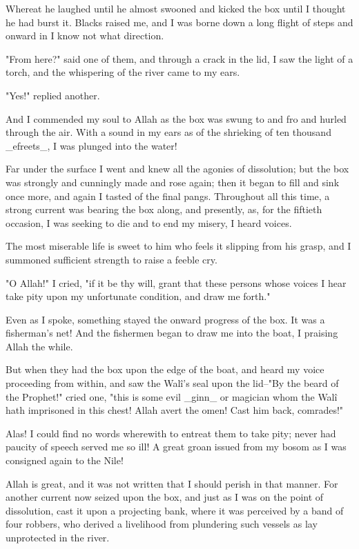 Whereat he laughed until he almost swooned and kicked the box until
I thought he had burst it. Blacks raised me, and I was borne down a
long flight of steps and onward in I know not what direction.

"From here?" said one of them, and through a crack in the lid, I saw
the light of a torch, and the whispering of the river came to my ears.

"Yes!" replied another.

And I commended my soul to Allah as the box was swung to and fro and
hurled through the air. With a sound in my ears as of the shrieking
of ten thousand _efreets_, I was plunged into the water!

Far under the surface I went and knew all the agonies of dissolution;
but the box was strongly and cunningly made and rose again; then it
began to fill and sink once more, and again I tasted of the final
pangs. Throughout all this time, a strong current was bearing the box
along, and presently, as, for the fiftieth occasion, I was seeking to
die and to end my misery, I heard voices.

The most miserable life is sweet to him who feels it slipping from his
grasp, and I summoned sufficient strength to raise a feeble cry.

"O Allah!" I cried, "if it be thy will, grant that these persons whose
voices I hear take pity upon my unfortunate condition, and draw me
forth."

Even as I spoke, something stayed the onward progress of the box. It
was a fisherman's net! And the fishermen began to draw me into the
boat, I praising Allah the while.

But when they had the box upon the edge of the boat, and heard my
voice proceeding from within, and saw the Walî's seal upon the
lid--"By the beard of the Prophet!" cried one, "this is some evil
_ginn_ or magician whom the Walî hath imprisoned in this chest! Allah
avert the omen! Cast him back, comrades!"

Alas! I could find no words wherewith to entreat them to take pity;
never had paucity of speech served me so ill! A great groan issued
from my bosom as I was consigned again to the Nile!

Allah is great, and it was not written that I should perish in that
manner. For another current now seized upon the box, and just as I was
on the point of dissolution, cast it upon a projecting bank, where it
was perceived by a band of four robbers, who derived a livelihood from
plundering such vessels as lay unprotected in the river.


